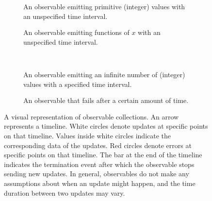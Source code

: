 \begin{figure}
  \centering
  \begin{subfigure}[t]{.45\textwidth}
    \resizebox{\textwidth}{!}{}
    \caption{An observable emitting primitive (integer) values with an unspecified time interval.}
    \label{fig:rmp:reactive_observable_raw}
  \end{subfigure}
  \hspace{\fill}
  \begin{subfigure}[t]{.45\textwidth}
    \resizebox{\textwidth}{!}{}
    \caption{An observable emitting functions of $x$ with an unspecified time interval.}
    \label{fig:rmp:reactive_observable_functions}
  \end{subfigure}
  \vspace{\fill}
  \\[3.5mm]
  \begin{subfigure}[t]{.45\textwidth}
    \resizebox{\textwidth}{!}{}
    \caption{An observable emitting an infinite number of (integer) values with a specified time interval.}
    \label{fig:rmp:reactive_observable_infinite}
  \end{subfigure}
  \hspace{\fill}
  \begin{subfigure}[t]{.45\textwidth}
    \resizebox{\textwidth}{!}{}
    \caption{An observable that fails after a certain amount of time.}
    \label{fig:rmp:reactive_observable_failing}
  \end{subfigure}
  \caption{A visual representation of observable collections.
    An arrow represents a timeline.
    White circles denote updates at specific points on that timeline.
    Values inside white circles indicate the corresponding data of the updates.
    Red circles denote errors at specific points on that timeline.
    The bar at the end of the timeline indicates the termination event after which the observable
    stops sending new updates.
    In general, observables do not make any assumptions about when an update might happen, and the
    time duration between two updates may vary.
  }
  \label{fig:rmp:reactive_observable}
\end{figure}

